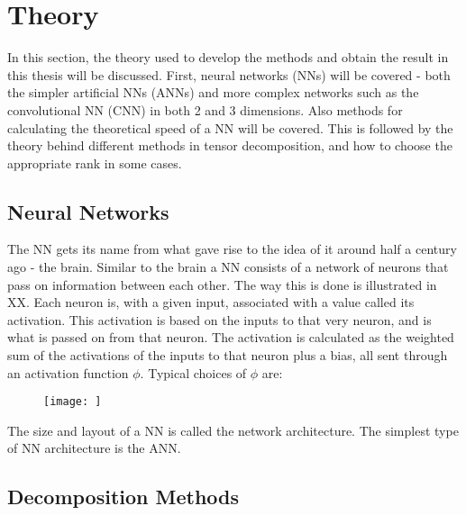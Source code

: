 \section{Theory} \label{tex:theory}
In this section, the theory used to develop the methods and obtain the result in this thesis will be discussed. First, neural networks (NNs) will be covered - both the simpler artificial NNs (ANNs) and more complex networks such as the convolutional NN (CNN) in both 2 and 3 dimensions. Also methods for calculating the theoretical speed of a NN will be covered. This is followed by the theory behind different methods in tensor decomposition, and how to choose the appropriate rank in some cases.

\subsection{Neural Networks}\label{tex:theory_NN}
The NN gets its name from what gave rise to the idea of it around half a century ago - the brain. Similar to the brain a NN consists of a network of neurons that pass on information between each other. The way this is done is illustrated in XX. Each neuron is, with a given input, associated with a value called its activation. This activation is based on the inputs to that very neuron, and is what is passed on from that neuron. The activation is calculated as the weighted sum of the activations of the inputs to that neuron plus a bias, all sent through an activation function $\phi$. Typical choices of $\phi$ are:
\begin{figure}
    \centering
    \texttt{[image: ]}
    \caption{}
    \label{fig:my_label}
\end{figure}

The size and layout of a NN is called the network architecture. The simplest type of NN architecture is the ANN. 

\subsection{Decomposition Methods}\label{tex:decomp_methods}